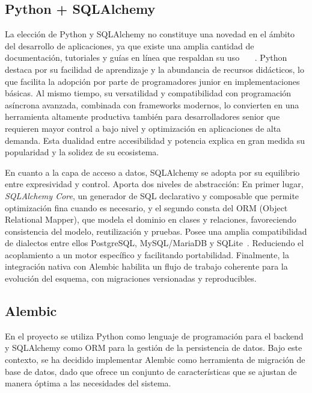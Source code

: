 \subsection{Python + SQLAlchemy}

La elección de Python y SQLAlchemy no constituye una novedad en el ámbito del desarrollo de aplicaciones, ya que existe una amplia cantidad de documentación, tutoriales y guías en línea que respaldan su uso
~\cite{4geeks_sqlalchemy_intro}~\cite{hostgator_orm}~\cite{auth0_sqlalchemy_tutorial}. Python destaca por su facilidad de aprendizaje y la abundancia de recursos didácticos, lo que facilita la adopción por parte de programadores junior en implementaciones básicas. Al mismo tiempo, su versatilidad y compatibilidad con programación asíncrona avanzada, combinada con frameworks modernos, lo convierten en una herramienta altamente productiva también para desarrolladores senior que requieren mayor control a bajo nivel y optimización en aplicaciones de alta demanda. Esta dualidad entre accesibilidad y potencia explica en gran medida su popularidad y la solidez de su ecosistema.
~\cite{learnpython_popularity}~\cite{anaconda_why_python}

En cuanto a la capa de acceso a datos, SQLAlchemy se adopta por su equilibrio entre expresividad y control. Aporta dos niveles de abstracción: En primer lugar, \textit{SQLAlchemy Core}, un generador de SQL declarativo y composable que permite optimización fina cuando es necesario, y el segundo consta del ORM (Object Relational Mapper), que modela el dominio en clases y relaciones, favoreciendo consistencia del modelo, reutilización y pruebas. Posee una amplia compatibilidad de dialectos entre ellos PostgreSQL, MySQL/MariaDB y SQLite~\cite{sqlalchemy_features}. Reduciendo el acoplamiento a un motor específico y facilitando portabilidad. Finalmente, la integración nativa con Alembic habilita un flujo de trabajo coherente para la evolución del esquema, con migraciones versionadas y reproducibles.

\subsection{Alembic}

En el proyecto se utiliza Python como lenguaje de programación para el backend y SQLAlchemy como ORM para la gestión de la persistencia de datos. Bajo este contexto, se ha decidido implementar Alembic como herramienta de migración de base de datos, dado que ofrece un conjunto de características que se ajustan de manera óptima a las necesidades del sistema.

